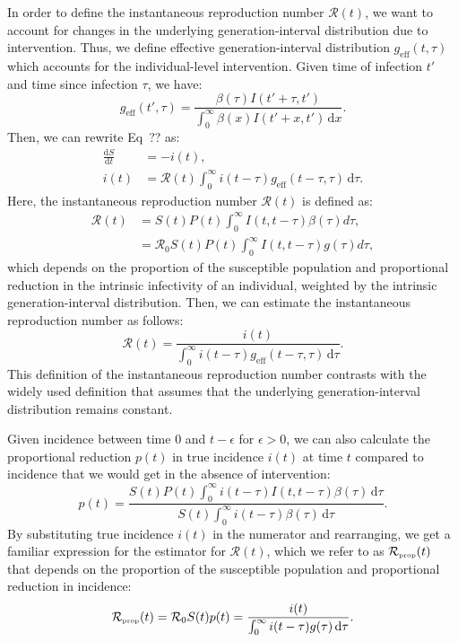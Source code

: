 \documentclass[12pt]{article}
\newcommand{\Rx}[1]{\ensuremath{{\mathcal R}_{#1}}\xspace}
\newcommand{\Ro}{\Rx{0}}
\newcommand{\RR}{\ensuremath{{\mathcal R}}\xspace}
\newcommand{\tsub}[2]{#1_{{\textrm{\tiny #2}}}}
\newcommand{\dd}[1]{\ensuremath{\, \mathrm{d}#1}}
\newcommand{\dtau}{\dd{\tau}}
\newcommand{\dx}{\dd{x}}
\newcommand{\geff}{g_{\textrm{eff}}} %
\begin{document}
In order to define the instantaneous reproduction number $\RR(t)$, we want to account for changes in the underlying generation-interval distribution due to intervention.
Thus, we define effective generation-interval distribution $\geff(t, \tau)$ which accounts for the individual-level intervention.
Given time of infection $t'$ and time since infection $\tau$, we have:
\begin{equation}
\geff(t', \tau)= \frac{\beta(\tau)I(t'+\tau,t')}{\int_0^\infty \beta(x)I(t'+x,t') \dx}.
\end{equation}
Then, we can rewrite Eq~?? as:
\begin{equation}
\begin{aligned}
\frac{\mathrm{d}S}{\mathrm{d}t} &= - i(t),\\
i(t) &=  \mathcal R(t) \int_0^\infty i(t-\tau)  \geff(t-\tau, \tau) \dtau.
\end{aligned}
\end{equation}
Here, the instantaneous reproduction number $\RR(t)$ is defined as:
\begin{align}
\RR(t) &= S(t) P(t) \int_0^\infty I(t,t-\tau) \beta(\tau) d\tau,\\
&= \Ro S(t) P(t) \int_0^\infty I(t,t-\tau) g(\tau) d\tau,
\end{align}
which depends on the proportion of the susceptible population and proportional reduction in the intrinsic infectivity of an individual, weighted by the intrinsic generation-interval distribution.
Then, we can estimate the instantaneous reproduction number as follows:
\begin{equation}
\RR(t)= \frac{i(t)}{\int_0^\infty i(t-\tau) \geff(t-\tau, \tau) \dtau}.
\end{equation}
This definition of the instantaneous reproduction number contrasts with the widely used definition that assumes that the underlying generation-interval distribution remains constant.

Given incidence between time $0$ and $t-\epsilon$ for $\epsilon > 0$, we can also calculate the proportional reduction $p(t)$ in true incidence $i(t)$ at time $t$ compared to incidence that we would get in the absence of intervention:
\begin{equation}
p(t) = \frac{S(t) P(t) \int_0^\infty i(t-\tau) I(t,t-\tau) \beta(\tau) \dtau}{S(t) \int_0^\infty i(t-\tau) \beta(\tau) \dtau}.
\end{equation}
By substituting true incidence $i(t)$ in the numerator and rearranging, we get a familiar expression for the estimator for $\RR(t)$, which we refer to as $\tsub{\RR}{prop}(t)$ that depends on the proportion of the susceptible population and proportional reduction in incidence:
\begin{equation}
\tsub{\RR}{prop}(t) = \Ro S(t) p(t) = \frac{i(t)}{\int_0^\infty i(t-\tau) g(\tau) \dtau}.
\end{equation}
\end{document}

